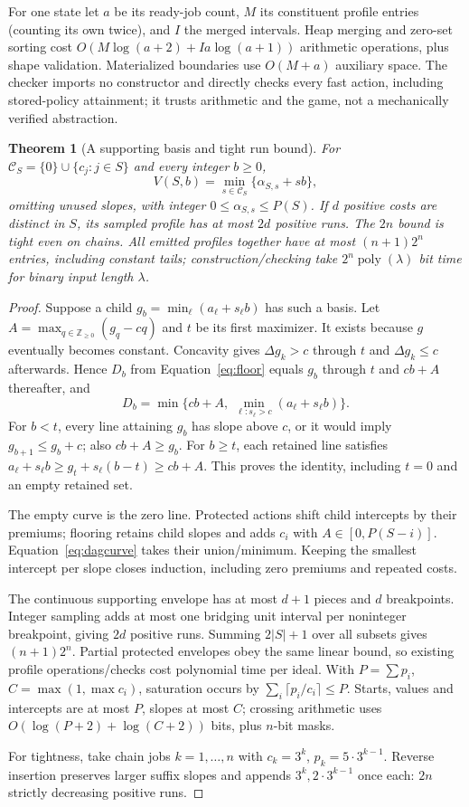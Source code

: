 \documentclass[acmsmall,screen,review,anonymous]{acmart}
\newtheorem{theorem}{Theorem}
\begin{document}
For one state let $a$ be its ready-job count, $M$ its constituent profile entries (counting its own twice), and $I$ the merged intervals. Heap merging and zero-set sorting cost $O(M\log(a+2)+Ia\log(a+1))$ arithmetic operations, plus shape validation. Materialized boundaries use $O(M+a)$ auxiliary space. The checker imports no constructor and directly checks every fast action, including stored-policy attainment; it trusts arithmetic and the game, not a mechanically verified abstraction.

\begin{theorem}[A supporting basis and tight run bound]
\label{thm:fpt}
For $\mathcal C_S=\{0\}\cup\{c_j:j\in S\}$ and every integer $b\ge0$,
\[
 V(S,b)=\min_{s\in\mathcal C_S}\{\alpha_{S,s}+sb\},
\]
omitting unused slopes, with integer $0\le\alpha_{S,s}\le P(S)$. If $d$ positive costs are distinct in $S$, its sampled profile has at most $2d$ positive runs. The $2n$ bound is tight even on chains. All emitted profiles together have at most $(n+1)2^n$ entries, including constant tails; construction/checking take $2^n\operatorname{poly}(\lambda)$ bit time for binary input length $\lambda$.
\end{theorem}
\begin{proof}
Suppose a child $g_b=\min_\ell(a_\ell+s_\ell b)$ has such a basis. Let $A=\max_{q\in\mathbb Z_{\ge0}}(g_q-cq)$ and $t$ be its first maximizer. It exists because $g$ eventually becomes constant. Concavity gives $\Delta g_k>c$ through $t$ and $\Delta g_k\le c$ afterwards. Hence $D_b$ from Equation~\eqref{eq:floor} equals $g_b$ through $t$ and $cb+A$ thereafter, and
\[
 D_b=\min\{cb+A,\ \min_{\ell:s_\ell>c}(a_\ell+s_\ell b)\}.
\]
For $b<t$, every line attaining $g_b$ has slope above $c$, or it would imply $g_{b+1}\le g_b+c$; also $cb+A\ge g_b$. For $b\ge t$, each retained line satisfies $a_\ell+s_\ell b\ge g_t+s_\ell(b-t)\ge cb+A$. This proves the identity, including $t=0$ and an empty retained set.

The empty curve is the zero line. Protected actions shift child intercepts by their premiums; flooring retains child slopes and adds $c_i$ with $A\in[0,P(S-i)]$. Equation~\eqref{eq:dagcurve} takes their union/minimum. Keeping the smallest intercept per slope closes induction, including zero premiums and repeated costs.

The continuous supporting envelope has at most $d+1$ pieces and $d$ breakpoints. Integer sampling adds at most one bridging unit interval per noninteger breakpoint, giving $2d$ positive runs. Summing $2|S|+1$ over all subsets gives $(n+1)2^n$. Partial protected envelopes obey the same linear bound, so existing profile operations/checks cost polynomial time per ideal. With $P=\sum p_i$, $C=\max(1,\max c_i)$, saturation occurs by $\sum_i\lceil p_i/c_i\rceil\le P$. Starts, values and intercepts are at most $P$, slopes at most $C$; crossing arithmetic uses $O(\log(P+2)+\log(C+2))$ bits, plus $n$-bit masks.

For tightness, take chain jobs $k=1,\ldots,n$ with $c_k=3^k$, $p_k=5\cdot3^{k-1}$. Reverse insertion preserves larger suffix slopes and appends $3^k,2\cdot3^{k-1}$ once each: $2n$ strictly decreasing positive runs.
\end{proof}
\end{document}
